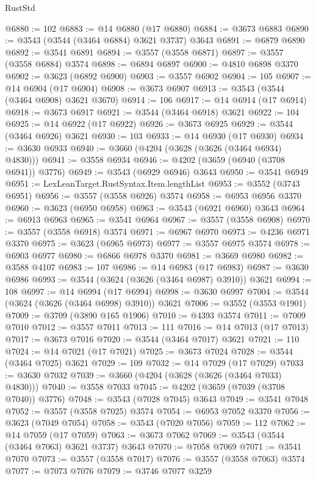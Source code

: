 \begin{lexlean}{RustStd}
\begin{coremodule}
@6880 := 102
@6883 := @14 @6880 (@17 @6880)
@6884 := @3673 @6883
@6890 := @3543 (@3544 (@3464 @6884) @3621 @3737) @3643
@6891 := @6879 @6890
@6892 := @3541 @6891
@6894 := @3557 (@3558 @6871)
@6897 := @3557 (@3558 @6884) @3574
@6898 := @6894 @6897
@6900 := @4810 @6898 @3370
@6902 := @3623 (@6892 @6900)
@6903 := @3557 @6902
@6904 := 105
@6907 := @14 @6904 (@17 @6904)
@6908 := @3673 @6907
@6913 := @3543 (@3544 (@3464 @6908) @3621 @3670)
@6914 := 106
@6917 := @14 @6914 (@17 @6914)
@6918 := @3673 @6917
@6921 := @3544 (@3464 @6918) @3621
@6922 := 104
@6925 := @14 @6922 (@17 @6922)
@6926 := @3673 @6925
@6929 := @3544 (@3464 @6926) @3621
@6930 := 103
@6933 := @14 @6930 (@17 @6930)
@6934 := @3630 @6933
@6940 := @3660 (@4204 (@3628 (@3626 (@3464 @6934) @4830)))
@6941 := @3558 @6934
@6946 := @4202 (@3659 (@6940 (@3708 @6941)) @3776)
@6949 := @3543 (@6929 @6946) @3643
@6950 := @3541 @6949
@6951 := LexLeanTarget.RustSyntax.Item.lengthList
@6953 := @3552 (@3743 @6951)
@6956 := @3557 (@3558 @6926) @3574
@6958 := @6953 @6956 @3370
@6960 := @3623 (@6950 @6958)
@6963 := @3543 (@6921 @6960) @3643
@6964 := @6913 @6963
@6965 := @3541 @6964
@6967 := @3557 (@3558 @6908)
@6970 := @3557 (@3558 @6918) @3574
@6971 := @6967 @6970
@6973 := @4236 @6971 @3370
@6975 := @3623 (@6965 @6973)
@6977 := @3557 @6975 @3574
@6978 := @6903 @6977
@6980 := @6866 @6978 @3370
@6981 := @3669 @6980
@6982 := @3588 @4107
@6983 := 107
@6986 := @14 @6983 (@17 @6983)
@6987 := @3630 @6986
@6993 := @3544 (@3624 (@3626 (@3464 @6987) @3910)) @3621
@6994 := 108
@6997 := @14 @6994 (@17 @6994)
@6998 := @3630 @6997
@7004 := @3544 (@3624 (@3626 (@3464 @6998) @3910)) @3621
@7006 := @3552 (@3553 @1901)
@7009 := @3709 (@3890 @165 @1906)
@7010 := @4393 @3574
@7011 := @7009 @7010
@7012 := @3557 @7011
@7013 := 111
@7016 := @14 @7013 (@17 @7013)
@7017 := @3673 @7016
@7020 := @3544 (@3464 @7017) @3621
@7021 := 110
@7024 := @14 @7021 (@17 @7021)
@7025 := @3673 @7024
@7028 := @3544 (@3464 @7025) @3621
@7029 := 109
@7032 := @14 @7029 (@17 @7029)
@7033 := @3630 @7032
@7039 := @3660 (@4204 (@3628 (@3626 (@3464 @7033) @4830)))
@7040 := @3558 @7033
@7045 := @4202 (@3659 (@7039 (@3708 @7040)) @3776)
@7048 := @3543 (@7028 @7045) @3643
@7049 := @3541 @7048
@7052 := @3557 (@3558 @7025) @3574
@7054 := @6953 @7052 @3370
@7056 := @3623 (@7049 @7054)
@7058 := @3543 (@7020 @7056)
@7059 := 112
@7062 := @14 @7059 (@17 @7059)
@7063 := @3673 @7062
@7069 := @3543 (@3544 (@3464 @7063) @3621 @3737) @3643
@7070 := @7058 @7069
@7071 := @3541 @7070
@7073 := @3557 (@3558 @7017)
@7076 := @3557 (@3558 @7063) @3574
@7077 := @7073 @7076
@7079 := @3746 @7077 @3259

\end{coremodule}
\end{lexlean}

